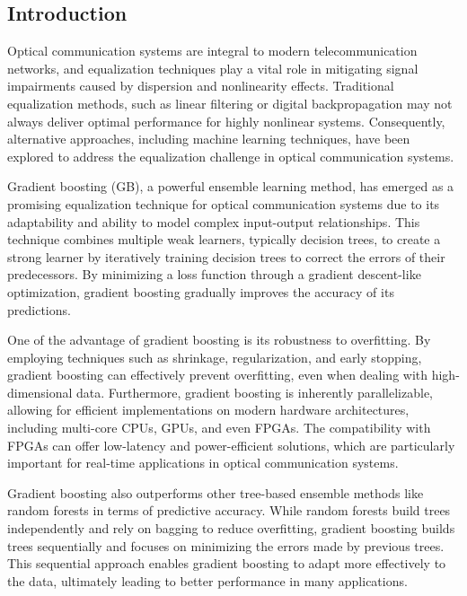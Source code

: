 \subsection{Introduction}
Optical communication systems are integral to modern telecommunication networks, and equalization techniques play a vital role in mitigating signal impairments caused by dispersion and nonlinearity effects. Traditional equalization methods, such as linear filtering or digital backpropagation may not always deliver optimal performance for highly nonlinear systems\cite{essiambre2012capacity, cartledge2017digital, bayvel2016maximizing}. Consequently, alternative approaches, including machine learning techniques, have been explored to address the equalization challenge in optical communication systems\cite{zibar2015machine, freire2021performance}.

Gradient boosting (GB), a powerful ensemble learning method, has emerged as a promising equalization technique for optical communication systems due to its adaptability and ability to model complex input-output relationships\cite{Chen:2016:XST:2939672.2939785,natekin2013gradient,friedman2002stochastic,bentejac2021comparative}. This technique combines multiple weak learners, typically decision trees, to create a strong learner by iteratively training decision trees to correct the errors of their predecessors. By minimizing a loss function through a gradient descent-like optimization, gradient boosting gradually improves the accuracy of its predictions.

One of the advantage of gradient boosting is its robustness to overfitting. By employing techniques such as shrinkage, regularization, and early stopping, gradient boosting can effectively prevent overfitting, even when dealing with high-dimensional data. Furthermore, gradient boosting is inherently parallelizable, allowing for efficient implementations on modern hardware architectures, including multi-core CPUs, GPUs, and even FPGAs\cite{alcolea2021fpga}. The compatibility with FPGAs can offer low-latency and power-efficient solutions, which are particularly important for real-time applications in optical communication systems.

Gradient boosting also outperforms other tree-based ensemble methods like random forests in terms of predictive accuracy\cite{natekin2013gradient}. While random forests build trees independently and rely on bagging to reduce overfitting, gradient boosting builds trees sequentially and focuses on minimizing the errors made by previous trees. This sequential approach enables gradient boosting to adapt more effectively to the data, ultimately leading to better performance in many applications.

